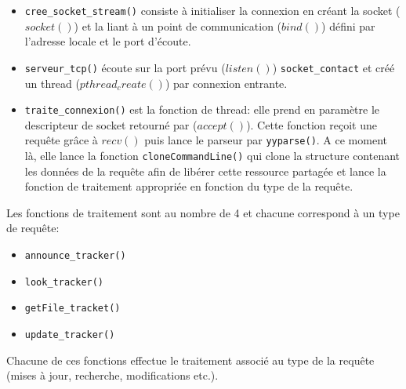 \begin{itemize}
\item \texttt{cree\_socket\_stream()} consiste à initialiser la connexion en créant la socket ($socket()$) et la liant à un point de communication ($bind()$) défini par l'adresse locale et le port d'écoute.
\item \texttt{serveur\_tcp()} écoute sur la port prévu ($listen()$) \texttt{socket\_contact} et créé un thread ($pthread_create()$) par connexion entrante.
\item \texttt{traite\_connexion()} est la fonction de thread: elle prend en paramètre le descripteur de socket retourné par ($accept()$). Cette fonction reçoit une requête grâce à $recv()$ puis lance le parseur par \texttt{yyparse()}. A ce moment là, elle lance la fonction \texttt{cloneCommandLine()} qui clone la structure contenant les données de la requête afin de libérer cette ressource partagée et lance la fonction de traitement appropriée en fonction du type de la requête.
\end{itemize}

Les fonctions de traitement sont au nombre de 4 et chacune correspond à un type de requête:

\begin{itemize}
\item \texttt{announce\_tracker()}
\item \texttt{look\_tracker()}
\item \texttt{getFile\_tracket()}
\item \texttt{update\_tracker()}
\end{itemize}

Chacune de ces fonctions effectue le traitement associé au type de la requête (mises à jour, recherche, modifications etc.).        
